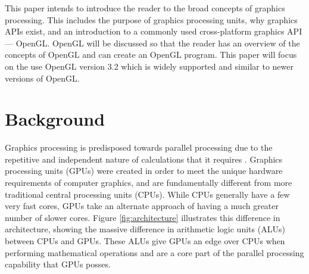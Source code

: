 \documentclass{article}
\begin{document}
This paper intends to introduce the reader to the broad concepts of graphics processing. This includes the purpose of graphics processing units, why graphics APIs exist, and an introduction to a commonly used cross-platform graphics API --- OpenGL. OpenGL will be discussed so that the reader has an overview of the concepts of OpenGL and can create an OpenGL program. This paper will focus on the use OpenGL version 3.2 which is widely supported and similar to newer versions of OpenGL.

\section{Background}
Graphics processing is predisposed towards parallel processing due to the repetitive and independent nature of calculations that it requires \cite[p.~4]{sellers2016}. Graphics processing units (GPUs) were created in order to meet the unique hardware requirements of computer graphics, and are fundamentally different from more traditional central processing units (CPUs). While CPUs generally have a few very fast cores, GPUs take an alternate approach of having a much greater number of slower cores. Figure \ref{fig:architecture} illustrates this difference in architecture, showing the massive difference in arithmetic logic units (ALUs) between CPUs and GPUs. These ALUs give GPUs an edge over CPUs when performing mathematical operations and are a core part of the parallel processing capability that GPUs posses.
\end{document}
